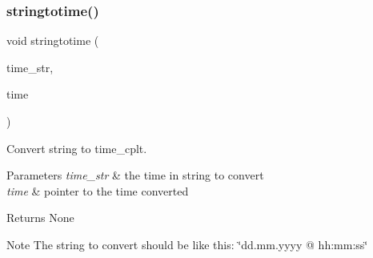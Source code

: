 \subsubsection{stringtotime()}
{\footnotesize\ttfamily void stringtotime (\begin{DoxyParamCaption}\item[{char $\ast$}]{time\+\_\+str,  }\item[{\textbf{ time\+\_\+cplt} $\ast$}]{time }\end{DoxyParamCaption})}



Convert string to time\+\_\+cplt. 


\begin{DoxyParams}{Parameters}
{\em time\+\_\+str} & the time in string to convert \\
\hline
{\em time} & pointer to the time converted\\
\hline
\end{DoxyParams}
\begin{DoxyReturn}{Returns}
None
\end{DoxyReturn}
\begin{DoxyNote}{Note}
The string to convert should be like this\+: \char`\"{}dd.\+mm.\+yyyy @ hh\+:mm\+:ss\char`\"{} 
\end{DoxyNote}
